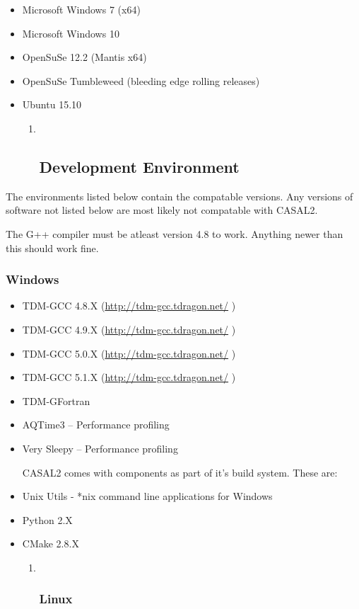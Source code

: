 \documentclass[a4paper,11pt,twoside,pdftex,draft]{article}
\begin{document}
\begin{itemize}
\item
  Microsoft Windows 7 (x64)
\item
  Microsoft Windows 10
\item
  OpenSuSe 12.2 (Mantis x64)
\item
  OpenSuSe Tumbleweed (bleeding edge rolling releases)
\item
  Ubuntu 15.10

  \begin{enumerate}
  \item ~
    \hypertarget{development-environment-1}{%
    \subsection{Development
    Environment}\label{development-environment-1}}
  \end{enumerate}
\end{itemize}

The environments listed below contain the compatable versions. Any
versions of software not listed below are most likely not compatable
with CASAL2.

The G++ compiler must be atleast version 4.8 to work. Anything newer
than this should work fine.

\hypertarget{windows}{%
\subsubsection{Windows}\label{windows}}

\begin{itemize}
\item
  TDM-GCC 4.8.X
  (\href{http://tdm-gcc.tdragon.net/}{{http://tdm-gcc.tdragon.net/}} )
\item
  TDM-GCC 4.9.X
  (\href{http://tdm-gcc.tdragon.net/}{{http://tdm-gcc.tdragon.net/}} )
\item
  TDM-GCC 5.0.X
  (\href{http://tdm-gcc.tdragon.net/}{{http://tdm-gcc.tdragon.net/}} )
\item
  TDM-GCC 5.1.X
  (\href{http://tdm-gcc.tdragon.net/}{{http://tdm-gcc.tdragon.net/}} )
\item
  TDM-GFortran
\item
  AQTime3 -- Performance profiling
\item
  Very Sleepy -- Performance profiling

  CASAL2 comes with components as part of it's build system. These are:
\item
  Unix Utils - *nix command line applications for Windows
\item
  Python 2.X
\item
  CMake 2.8.X

  \begin{enumerate}
  \item ~
    \hypertarget{linux}{%
    \subsubsection{Linux}\label{linux}}
  \end{enumerate}
\end{itemize}
\end{document}
